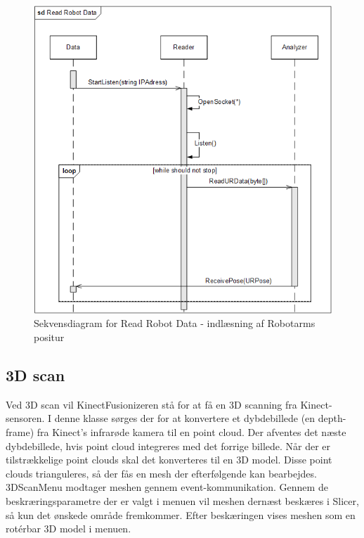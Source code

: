 \begin{figure}[H]
    \centering
    \includegraphics[width=1\textwidth]{figurer/d/Design/Sequence/sd_reading}
    \caption{Sekvensdiagram for Read Robot Data - indlæsning af Robotarms positur}
    \label{sd_reading}
\end{figure}

\subsection{3D scan}
Ved 3D scan vil KinectFusionizeren stå for at få en 3D scanning fra Kinect-sensoren. I denne klasse sørges der for at konvertere et dybdebillede (en depth-frame) fra Kinect's infrarøde kamera til en point cloud. Der afventes det næste dybdebillede, hvis point cloud integreres med det forrige billede. Når der er tilstrækkelige point clouds skal det konverteres til en 3D model.  Disse point clouds trianguleres, så der fås en mesh der efterfølgende kan bearbejdes. 3DScanMenu modtager meshen gennem event-kommunikation.
Gennem de beskræringsparametre der er valgt i menuen vil meshen dernæst beskæres i Slicer, så kun det ønskede område fremkommer. Efter beskæringen vises meshen som en rotérbar 3D model i menuen.

